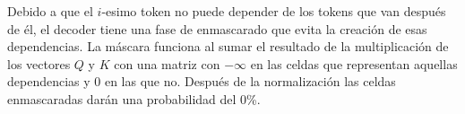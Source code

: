 \documentclass[../main.tex]{subfiles}
\begin{document}
Debido a que el $i$-esimo token no puede depender de los tokens que van después de él,
el decoder tiene una fase de enmascarado que evita la creación de esas dependencias.
La máscara funciona al sumar el resultado de la multiplicación de los vectores $Q$ y $K$
con una matriz con $-\infty$ en las celdas que representan aquellas dependencias y 0 en las que no.
Después de la normalización las celdas enmascaradas darán una probabilidad del 0\%.


%
%
%
\end{document}
